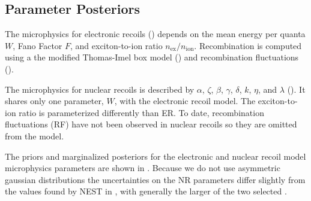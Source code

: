 \subsection{Parameter Posteriors}
\label{subsec:er_nr_calibrations_results_par_post}
The microphysics for electronic recoils () depends on the mean energy
per quanta $W$, Fano Factor $F$, and exciton-to-ion ratio $n_{\mathrm{ex}} / n_{\mathrm{ion}}$.  Recombination is computed using
a the modified Thomas-Imel box model () and recombination fluctuations
().

The microphysics for nuclear recoils is described by $\alpha$, $\zeta$, $\beta$, $\gamma$, $\delta$, $k$, $\eta$, and $\lambda$
().  It shares only one
parameter, $W$, with the electronic recoil model.  The exciton-to-ion ratio is parameterized differently than ER.  To date,
recombination fluctuations (RF) have not been observed in nuclear recoils so they are omitted from the model.

The priors and marginalized posteriors for the electronic and nuclear recoil model microphysics parameters are shown in
.  Because we
do not use asymmetric gaussian distributions the uncertainties on the NR parameters differ slightly from the values
found by NEST in , with generally the larger of the two selected
.

